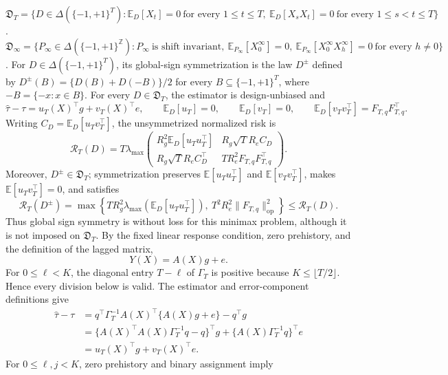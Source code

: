 \(\mathfrak D_T=\{D\in\Delta(\{-1,+1\}^T):\mathbb E_D[X_t]=0\ \text{for every }1\le t\le T,\ \mathbb E_D[X_sX_t]=0\ \text{for every }1\le s<t\le T\}\).
\(\mathfrak D_{\infty}=\{P_{\infty}\in\Delta(\{-1,+1\}^{\mathbb Z}):P_{\infty}\ \text{is shift invariant},\ \mathbb E_{P_{\infty}}[X_0^{\infty}]=0,\ \mathbb E_{P_{\infty}}[X_0^{\infty}X_h^{\infty}]=0\ \text{for every }h\ne0\}\).
For \(D\in\Delta(\{-1,+1\}^T)\), its global-sign symmetrization is the law \(D^{\pm}\) defined by \(D^{\pm}(B)=\{D(B)+D(-B)\}/2\) for every \(B\subseteq\{-1,+1\}^T\), where \(-B=\{-x:x\in B\}\).
For every \(D\in\mathfrak D_T\), the estimator is design-unbiased and
\[
\widehat\tau-\tau=u_T(X)^{\top}g+v_T(X)^{\top}e,
\qquad
\mathbb E_D[u_T]=0,
\qquad
\mathbb E_D[v_T]=0,
\qquad
\mathbb E_D[v_Tv_T^{\top}]=F_{T,q}F_{T,q}^{\top}.
\]
Writing \(C_D=\mathbb E_D[u_Tv_T^{\top}]\), the unsymmetrized normalized risk is
\[
\mathcal R_T(D)
=T\lambda_{\max}\!\begin{pmatrix}
R_g^2\mathbb E_D[u_Tu_T^{\top}]&R_g\sqrt T R_e C_D\\
R_g\sqrt T R_e C_D^{\top}&T R_e^2F_{T,q}F_{T,q}^{\top}
\end{pmatrix}.
\]
Moreover, \(D^{\pm}\in\mathfrak D_T\); symmetrization preserves \(\mathbb E[u_Tu_T^{\top}]\) and \(\mathbb E[v_Tv_T^{\top}]\), makes \(\mathbb E[u_Tv_T^{\top}]=0\), and satisfies
\[
\mathcal R_T(D^{\pm})
=\max\!\left\{T R_g^2\lambda_{\max}(\mathbb E_D[u_Tu_T^{\top}]),\ T^2R_e^2\lVert F_{T,q}\rVert_{\mathrm{op}}^2\right\}
\le \mathcal R_T(D).
\]
Thus global sign symmetry is without loss for this minimax problem, although it is not imposed on \(\mathfrak D_T\).
By the fixed linear response condition, zero prehistory, and the definition of the lagged matrix,
\[
Y(X)=A(X)g+e.
\]
For \(0\le \ell<K\), the diagonal entry \(T-\ell\) of \(\Gamma_T\) is positive because \(K\le\lfloor T/2\rfloor\).  Hence every division below is valid.  The estimator and error-component definitions give
\[
\begin{aligned}
\widehat\tau-\tau
&=q^{\top}\Gamma_T^{-1}A(X)^{\top}\{A(X)g+e\}-q^{\top}g\\
&=\{A(X)^{\top}A(X)\Gamma_T^{-1}q-q\}^{\top}g
  +\{A(X)\Gamma_T^{-1}q\}^{\top}e\\
&=u_T(X)^{\top}g+v_T(X)^{\top}e.
\end{aligned}
\tag{1}
\]
For \(0\le \ell,j<K\), zero prehistory and binary assignment imply
